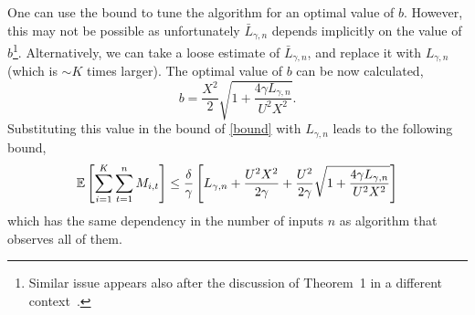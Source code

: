 {One can use the bound to tune the algorithm for an optimal  value of
$b$. However, this may not be possible as unfortunately ${\bar L}_{\gamma,n}$ depends
implicitly on the value of $b$\footnote{Similar issue appears also
  after the discussion of Theorem~1 in a different context~\cite{cesa2006worst}.}.
 Alternatively, we can take a
loose estimate of ${\bar L}_{\gamma,n}$, and replace it with
$L_{\gamma,n}$ (which is $\sim K$ times larger). The optimal value of
$b$ can be now calculated, 
\begin{displaymath}
b=\frac{X^2}{2}{\sqrt{1+\frac{4\gamma L_{\gamma,n}}{U^{2}X^2}}}.
\end{displaymath}
Substituting this value in the bound of \eqref{bound} with
$L_{\gamma,n}$ leads to the following bound, 
\begin{equation*}
\mathbb{E}\left[{\sum_{i=1}^{K}\sum_{t=1}^{n}{M_{i,t}}}\right]
\le\frac{\delta}{\gamma}\left[{L_{\gamma,n}+\frac{U^{2}X^2}{2\gamma}+\frac{U^{2}}{2\gamma}\sqrt{1+\frac{4\gamma L_{\gamma,n}}{U^{2}X^2}}}\right]
\end{equation*}
which has the same dependency in the number of inputs $n$ as algorithm
that observes all of them.


}
